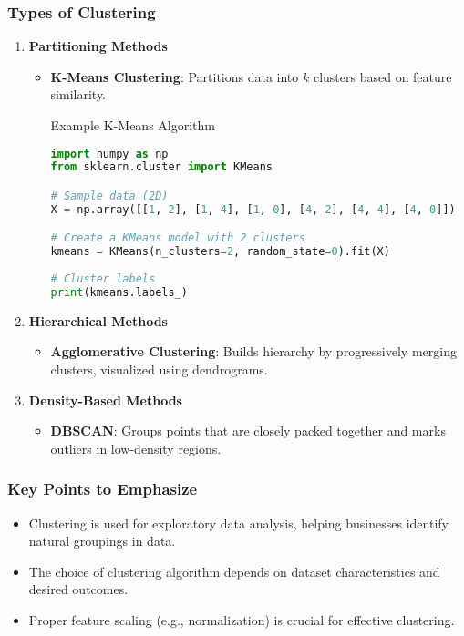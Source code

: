 \documentclass[aspectratio=169]{beamer}
\begin{document}
\begin{frame}[fragile]
    \frametitle{Types of Clustering}
    \begin{enumerate}
        \item \textbf{Partitioning Methods}
            \begin{itemize}
                \item \textbf{K-Means Clustering}: Partitions data into $k$ clusters based on feature similarity.
                \begin{block}{Example K-Means Algorithm}
                    \begin{lstlisting}[language=python]
import numpy as np
from sklearn.cluster import KMeans

# Sample data (2D)
X = np.array([[1, 2], [1, 4], [1, 0], [4, 2], [4, 4], [4, 0]])

# Create a KMeans model with 2 clusters
kmeans = KMeans(n_clusters=2, random_state=0).fit(X)
            
# Cluster labels
print(kmeans.labels_)
                    \end{lstlisting}
                \end{block}
            \end{itemize}
        \item \textbf{Hierarchical Methods}
            \begin{itemize}
                \item \textbf{Agglomerative Clustering}: Builds hierarchy by progressively merging clusters, visualized using dendrograms.
            \end{itemize}
        \item \textbf{Density-Based Methods}
            \begin{itemize}
                \item \textbf{DBSCAN}: Groups points that are closely packed together and marks outliers in low-density regions.
            \end{itemize}
    \end{enumerate}
\end{frame}

\begin{frame}[fragile]
    \frametitle{Key Points to Emphasize}
    \begin{itemize}
        \item Clustering is used for exploratory data analysis, helping businesses identify natural groupings in data.
        \item The choice of clustering algorithm depends on dataset characteristics and desired outcomes.
        \item Proper feature scaling (e.g., normalization) is crucial for effective clustering.
    \end{itemize}
\end{frame}
\end{document}
